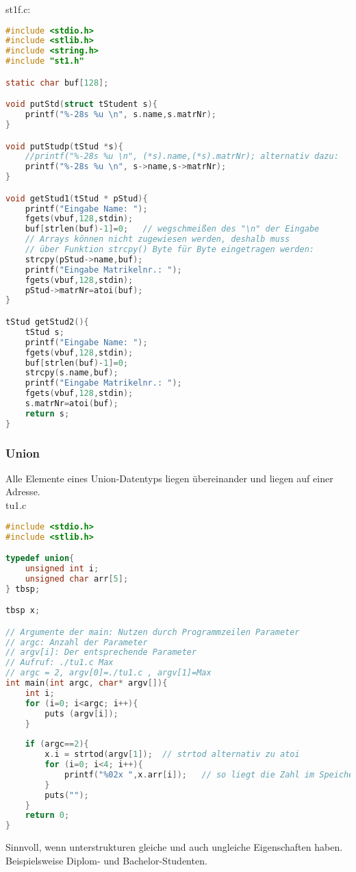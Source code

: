 st1f.c:
\begin{lstlisting}[language=C]
#include <stdio.h>
#include <stlib.h>
#include <string.h>
#include "st1.h"

static char buf[128]; 

void putStd(struct tStudent s){
	printf("%-28s %u \n", s.name,s.matrNr);
}

void putStudp(tStud *s){
	//printf("%-28s %u \n", (*s).name,(*s).matrNr); alternativ dazu:
	printf("%-28s %u \n", s->name,s->matrNr);
}

void getStud1(tStud * pStud){
	printf("Eingabe Name: ");
	fgets(vbuf,128,stdin); 
	buf[strlen(buf)-1]=0;	// wegschmeißen des "\n" der Eingabe
	// Arrays können nicht zugewiesen werden, deshalb muss 
	// über Funktion strcpy() Byte für Byte eingetragen werden:
	strcpy(pStud->name,buf);
	printf("Eingabe Matrikelnr.: "); 
	fgets(vbuf,128,stdin); 
	pStud->matrNr=atoi(buf);
}

tStud getStud2(){
	tStud s;
	printf("Eingabe Name: ");
	fgets(vbuf,128,stdin); 
	buf[strlen(buf)-1]=0;
	strcpy(s.name,buf);
	printf("Eingabe Matrikelnr.: "); 
	fgets(vbuf,128,stdin); 
	s.matrNr=atoi(buf);
	return s;
}
\end{lstlisting}
\subsubsection{Union}
Alle Elemente eines Union-Datentyps liegen übereinander und liegen auf einer Adresse. \medskip\\
tu1.c
\begin{lstlisting}[language=C]
#include <stdio.h>
#include <stlib.h>

typedef union{
	unsigned int i;
	unsigned char arr[5];
} tbsp;

tbsp x;

// Argumente der main: Nutzen durch Programmzeilen Parameter
// argc: Anzahl der Parameter
// argv[i]: Der entsprechende Parameter
// Aufruf: ./tu1.c Max
// argc = 2, argv[0]=./tu1.c , argv[1]=Max
int main(int argc, char* argv[]){
	int i;
	for (i=0; i<argc; i++){
		puts (argv[i]);
	}
	
	if (argc==2){
		x.i = strtod(argv[1]);	// strtod alternativ zu atoi
		for (i=0; i<4; i++){
			printf("%02x ",x.arr[i]);	// so liegt die Zahl im Speicher
		}
		puts("");
	}
	return 0;
}

\end{lstlisting}

Sinnvoll, wenn unterstrukturen gleiche und auch ungleiche Eigenschaften haben. Beispielsweise Diplom- und Bachelor-Studenten.

